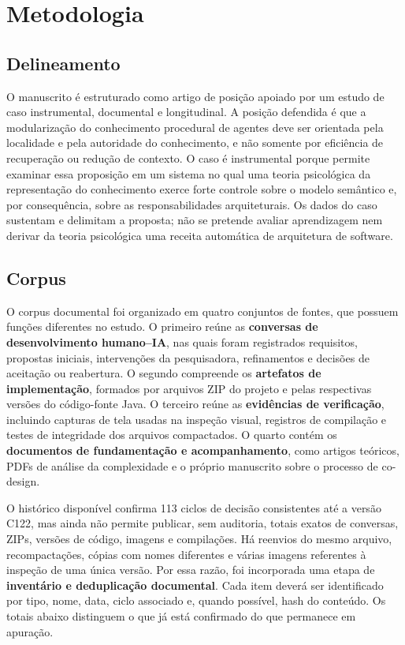 \documentclass[preprint,12pt,authoryear]{elsarticle}
\begin{document}
\section{Metodologia}
\subsection{Delineamento}
O manuscrito é estruturado como artigo de posição apoiado por um estudo de caso instrumental, documental e longitudinal. A posição defendida é que a modularização do conhecimento procedural de agentes deve ser orientada pela localidade e pela autoridade do conhecimento, e não somente por eficiência de recuperação ou redução de contexto. O caso é instrumental porque permite examinar essa proposição em um sistema no qual uma teoria psicológica da representação do conhecimento exerce forte controle sobre o modelo semântico e, por consequência, sobre as responsabilidades arquiteturais. Os dados do caso sustentam e delimitam a proposta; não se pretende avaliar aprendizagem nem derivar da teoria psicológica uma receita automática de arquitetura de software.

\subsection{Corpus}
O corpus documental foi organizado em quatro conjuntos de fontes, que possuem funções diferentes no estudo. O primeiro reúne as \textbf{conversas de desenvolvimento humano--IA}, nas quais foram registrados requisitos, propostas iniciais, intervenções da pesquisadora, refinamentos e decisões de aceitação ou reabertura. O segundo compreende os \textbf{artefatos de implementação}, formados por arquivos ZIP do projeto e pelas respectivas versões do código-fonte Java. O terceiro reúne as \textbf{evidências de verificação}, incluindo capturas de tela usadas na inspeção visual, registros de compilação e testes de integridade dos arquivos compactados. O quarto contém os \textbf{documentos de fundamentação e acompanhamento}, como artigos teóricos, PDFs de análise da complexidade e o próprio manuscrito sobre o processo de co-design.

O histórico disponível confirma 113 ciclos de decisão consistentes até a versão C122, mas ainda não permite publicar, sem auditoria, totais exatos de conversas, ZIPs, versões de código, imagens e compilações. Há reenvios do mesmo arquivo, recompactações, cópias com nomes diferentes e várias imagens referentes à inspeção de uma única versão. Por essa razão, foi incorporada uma etapa de \textbf{inventário e deduplicação documental}. Cada item deverá ser identificado por tipo, nome, data, ciclo associado e, quando possível, hash do conteúdo. Os totais abaixo distinguem o que já está confirmado do que permanece em apuração.
\end{document}
